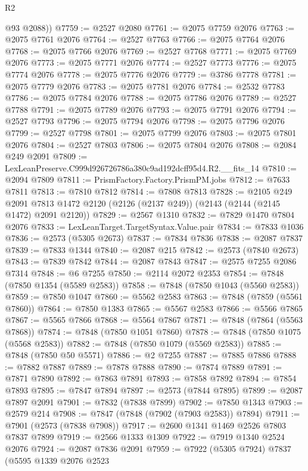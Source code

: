 \begin{lexlean}{R2}
\begin{coremodule}
        @93
        @2088))
@7759 := @2527 @2080
@7761 := @2075 @7759 @2076
@7763 := @2075 @7761 @2076
@7764 := @2527 @7763
@7766 := @2075 @7764 @2076
@7768 := @2075 @7766 @2076
@7769 := @2527 @7768
@7771 := @2075 @7769 @2076
@7773 := @2075 @7771 @2076
@7774 := @2527 @7773
@7776 := @2075 @7774 @2076
@7778 := @2075 @7776 @2076
@7779 := @3786 @7778
@7781 := @2075 @7779 @2076
@7783 := @2075 @7781 @2076
@7784 := @2532 @7783
@7786 := @2075 @7784 @2076
@7788 := @2075 @7786 @2076
@7789 := @2527 @7788
@7791 := @2075 @7789 @2076
@7793 := @2075 @7791 @2076
@7794 := @2527 @7793
@7796 := @2075 @7794 @2076
@7798 := @2075 @7796 @2076
@7799 := @2527 @7798
@7801 := @2075 @7799 @2076
@7803 := @2075 @7801 @2076
@7804 := @2527 @7803
@7806 := @2075 @7804 @2076
@7808 := @2084 @249 @2091
@7809 := LexLeanPreserve.C999d926726786a380c9ad192dcff95d4.R2.__fits_14
@7810 := @2094 @7809
@7811 := PrismFactory.Factory.PrismPM.jobs
@7812 := @7633 @7811
@7813 := @7810 @7812
@7814 := @7808 @7813
@7828 := @2105
    @249
    @2091
    @7813
    @1472
    @2120
    (@2126 (@2137 @249))
    (@2143 (@2144 (@2145 @1472) @2091 @2120))
@7829 := @2567 @1310
@7832 := @7829 @1470 @7804 @2076
@7833 := LexLeanTarget.TargetSyntax.Value.pair
@7834 := @7833 @1036
@7836 := @2573 (@5305 @2673)
@7837 := @7834 @7836
@7838 := @2087 @7837
@7839 := @7833 @1344
@7840 := @2087 @215
@7842 := @2573 (@7840 @2673)
@7843 := @7839 @7842
@7844 := @2087 @7843
@7847 := @2575 @7255 @2086 @7314
@7848 := @6 @7255
@7850 := @2114 @2072 @2353
@7854 := @7848 (@7850 @1354 (@5589 @2583))
@7858 := @7848 (@7850 @1043 (@5560 @2583))
@7859 := @7850 @1047
@7860 := @5562 @2583
@7863 := @7848 (@7859 (@5561 @7860))
@7864 := @7850 @1383
@7865 := @5567 @2583
@7866 := @5566 @7865
@7867 := @5565 @7866
@7868 := @5564 @7867
@7871 := @7848 (@7864 (@5563 @7868))
@7874 := @7848 (@7850 @1051 @7860)
@7878 := @7848 (@7850 @1075 (@5568 @2583))
@7882 := @7848 (@7850 @1079 (@5569 @2583))
@7885 := @7848 (@7850 @50 @5571)
@7886 := @2 @7255
@7887 := @7885 @7886
@7888 := @7882 @7887
@7889 := @7878 @7888
@7890 := @7874 @7889
@7891 := @7871 @7890
@7892 := @7863 @7891
@7893 := @7858 @7892
@7894 := @7854 @7893
@7895 := @7847 @7894
@7897 := @2573 (@7844 @7895)
@7899 := @2087 @7897 @2091
@7901 := @7832 (@7838 @7899)
@7902 := @7850 @1343
@7903 := @2579 @214
@7908 := @7847 (@7848 (@7902 (@7903 @2583)) @7894)
@7911 := @7901 (@2573 (@7838 @7908))
@7917 := @2600 @1341 @1469 @2526 @7803 @7837 @7899
@7919 := @2566 @1333 @1309
@7922 := @7919 @1340 @2524 @2076
@7924 := @2087 @7836 @2091
@7959 := @7922
    (@5305 @7924)
    @7837
    (@5595
      @1339
      @2076
      @2523

\end{coremodule}
\end{lexlean}
